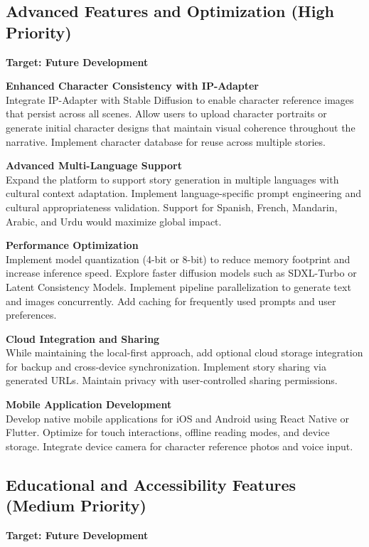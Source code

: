 \subsection{Advanced Features and Optimization (High Priority)}
\textbf{Target: Future Development}

\textbf{Enhanced Character Consistency with IP-Adapter}\\
Integrate IP-Adapter \cite{ipadapter2023} with Stable Diffusion to enable character reference images that persist across all scenes. Allow users to upload character portraits or generate initial character designs that maintain visual coherence throughout the narrative. Implement character database for reuse across multiple stories.

\textbf{Advanced Multi-Language Support}\\
Expand the platform to support story generation in multiple languages with cultural context adaptation. Implement language-specific prompt engineering and cultural appropriateness validation. Support for Spanish, French, Mandarin, Arabic, and Urdu would maximize global impact.

\textbf{Performance Optimization}\\
Implement model quantization (4-bit or 8-bit) to reduce memory footprint and increase inference speed. Explore faster diffusion models such as SDXL-Turbo or Latent Consistency Models. Implement pipeline parallelization to generate text and images concurrently. Add caching for frequently used prompts and user preferences.

\textbf{Cloud Integration and Sharing}\\
While maintaining the local-first approach, add optional cloud storage integration for backup and cross-device synchronization. Implement story sharing via generated URLs. Maintain privacy with user-controlled sharing permissions.

\textbf{Mobile Application Development}\\
Develop native mobile applications for iOS and Android using React Native or Flutter. Optimize for touch interactions, offline reading modes, and device storage. Integrate device camera for character reference photos and voice input.

\subsection{Educational and Accessibility Features (Medium Priority)}
\textbf{Target: Future Development}

